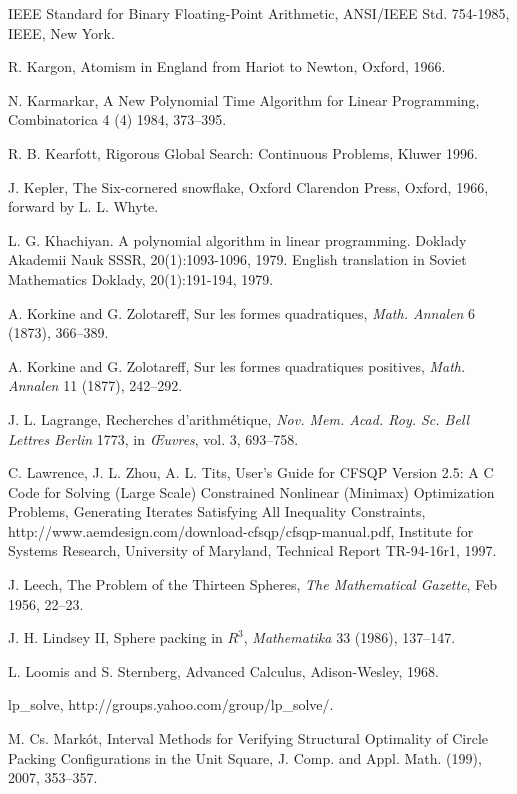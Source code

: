 \begin{thebibliography}{CHMS94}
 IEEE Standard for Binary Floating-Point
Arithmetic, ANSI/IEEE Std. 754-1985, IEEE, New York.


 R. Kargon, Atomism in England from Hariot to Newton,
    Oxford, 1966.

 N. Karmarkar, A New Polynomial Time Algorithm
for Linear Programming, Combinatorica 4 (4) 1984, 373--395.

 R. B. Kearfott, Rigorous Global Search: Continuous
Problems, Kluwer 1996.

 J. Kepler, The Six-cornered snowflake, Oxford Clarendon Press,
    Oxford, 1966,  forward by L. L. Whyte.

 L. G. Khachiyan. A polynomial algorithm in linear programming. Doklady Akademii Nauk SSSR, 20(1):1093-1096, 1979. English translation in Soviet Mathematics Doklady, 20(1):191-194, 1979.

 A. Korkine and  G. Zolotareff, Sur les formes quadratiques,
    {\it Math. Annalen} 6 (1873), 366--389.

 A. Korkine and  G. Zolotareff, Sur les formes quadratiques
    positives, {\it Math. Annalen} 11 (1877), 242--292.

 J. L. Lagrange,  Recherches d'arithm\'etique, {\it Nov. Mem.
    Acad. Roy. Sc. Bell Lettres Berlin} 1773, in {\it \OE uvres}, vol. 3,
    693--758.

 C. Lawrence, J. L. Zhou, A. L. Tits,  User's Guide for CFSQP Version 2.5:
   A C Code for Solving (Large Scale) Constrained Nonlinear (Minimax) Optimization Problems, Generating
   Iterates Satisfying All Inequality Constraints, 
   http://www.aemdesign.com/download-cfsqp/cfsqp-manual.pdf, 
   Institute for Systems Research, University of Maryland, Technical Report TR-94-16r1, 1997.

 J. Leech, The Problem of the Thirteen Spheres,
{\it The Mathematical Gazette}, Feb 1956, 22--23.

 J. H. Lindsey II, Sphere packing in $R^3$, {\it Mathematika}
    33 (1986), 137--147.

 L. Loomis and S. Sternberg, Advanced Calculus, Adison-Wesley, 1968.

 lp\_solve, http://groups.yahoo.com/group/lp\_solve/.

 M. Cs. Mark\'ot, Interval Methods for
Verifying Structural Optimality of Circle Packing Configurations
in the Unit Square,  J. Comp. and Appl. Math. (199),
2007, 353--357.


\end{thebibliography}
